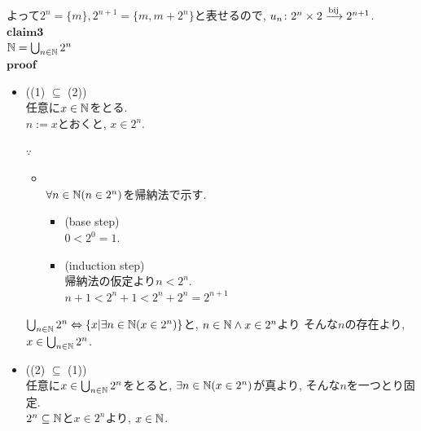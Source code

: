   よって$2^n = \{m\}, 2^{n+1} = \{m, m+2^n\}$と表せるので,
  $u_n\colon 2^n \times 2 \xrightarrow{\text{bij}} 2^{n+1}$.\\
$\mathbf{claim3}$\\
  $\mathbb{N} = \bigcup _{n \in \mathbb{N}} 2^n$\\
  $\mathbf{proof}$
    \begin{itemize}
      \item[]\hspace{-0.5cm} ((1) $\subseteq$ (2))\\
        任意に$x \in \mathbb{N}$をとる.\\
        $n := x$とおくと,
        $x \in 2^n$.
        \begin{sub-block}{{\boldmath $\because$}\,}
          \begin{itemize}
            \item[] \hspace{-0.5cm} \\
              $\forall n \in \mathbb{N} (n \in 2^n)$を帰納法で示す.
                \begin{itemize}
                  \item[]\hspace{-0.5cm} (base step)\\
                    $0 < 2^0 = 1$.
                  \item[]\hspace{-0.5cm} (induction step)\\
                    帰納法の仮定より$n < 2^n$.\\
                    $n+1 < 2^n + 1< 2^n + 2^n = 2^{n+1}$
                \end{itemize}
          \end{itemize}
        \end{sub-block}
        $\bigcup _{n \in \mathbb{N}} 2^n \Leftrightarrow \{x | \exists n \in \mathbb{N} (x \in 2^n)\}$と,
        $n \in \mathbb{N} \land x \in 2^n$より
        そんな$n$の存在より,
        $x \in \bigcup _{n \in \mathbb{N}} 2^n$.
      \item[]\hspace{-0.5cm} ((2) $\subseteq$ (1))\\
        任意に$x \in \bigcup _{n \in \mathbb{N}} 2^n$をとると,
        $\exists n \in \mathbb{N} (x \in 2^n)$が真より,
        そんな$n$を一つとり固定.\\
        $2^n \subseteq \mathbb{N}$と$x \in 2^n$より,
        $x \in \mathbb{N}$.
    \end{itemize}
